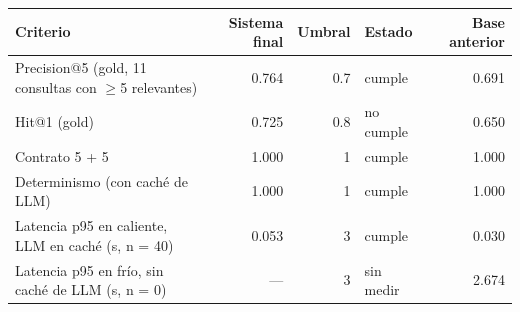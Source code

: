 \begin{tabular}{p{6.6cm}rrlr}
\toprule
Criterio & Sistema final & Umbral & Estado & Base anterior \\
\midrule
Precision@5 (gold, 11 consultas con $\geq$5 relevantes) & 0.764 & 0.7 & cumple & 0.691 \\
Hit@1 (gold) & 0.725 & 0.8 & no cumple & 0.650 \\
Contrato 5 + 5 & 1.000 & 1 & cumple & 1.000 \\
Determinismo (con caché de LLM) & 1.000 & 1 & cumple & 1.000 \\
Latencia p95 en caliente, LLM en caché (s, n = 40) & 0.053 & 3 & cumple & 0.030 \\
Latencia p95 en frío, sin caché de LLM (s, n = 0) & --- & 3 & sin medir & 2.674 \\
\bottomrule
\end{tabular}
